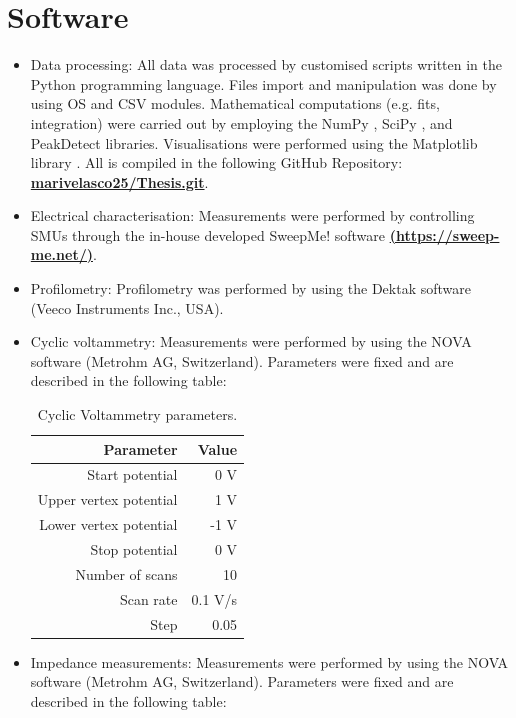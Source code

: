 \section{Software} \label{param}
\begin{itemize}
\item Data processing: All data was processed by customised scripts written in the Python programming language. Files import and manipulation was done by using OS \cite{os_module} and CSV \cite{csv_module} modules. Mathematical computations (e.g. fits, integration) were carried out by employing the NumPy \cite{numpy_2012}, SciPy \cite{scipy_linreg}, and PeakDetect \cite{peakdetect} libraries. Visualisations were performed using the Matplotlib library \cite{matplotlib_2012}. All is compiled in the following GitHub Repository: \href{https://github.com/marivelascoe25/Thesis.git}{\textbf{marivelasco25/Thesis.git}}.
\item Electrical characterisation: Measurements were performed by controlling SMUs through the in-house developed SweepMe! software \href{https://sweep-me.net/}{\textbf{(https://sweep-me.net/)}}. 
\item Profilometry: Profilometry was performed by using the Dektak software (Veeco Instruments Inc., USA).
\item Cyclic voltammetry: Measurements were performed by using the NOVA software (Metrohm AG, Switzerland). Parameters were fixed and are described in the following table: 

\begin{table}[h]
	\centering
	\caption{Cyclic Voltammetry parameters.}
	\begin{tabular}{r r} \hline
		Parameter	& Value \\ \hline
		Start potential	& 0 V \\ 
		Upper vertex potential	& 1 V \\ 
		Lower vertex potential	& -1 V \\ 
		Stop potential	& 0 V \\ 
		Number of scans	& 10 \\ 
		Scan rate	& 0.1 V/s \\ 
		Step	& 0.05 \\ \hline
	\end{tabular}
	\label{tab:CV}
\end{table}

\item Impedance measurements: Measurements were performed by using the NOVA software (Metrohm AG, Switzerland). Parameters were fixed and are described in the following table: 


\end{itemize}
